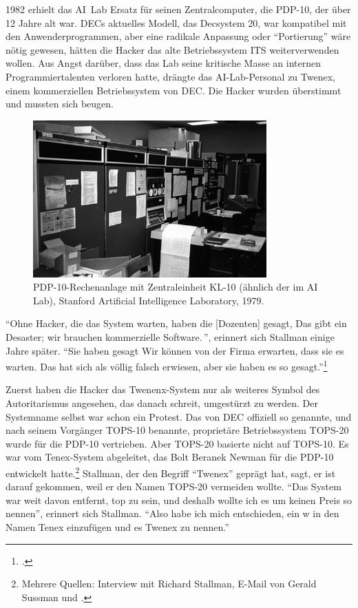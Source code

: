 1982 erhielt das AI~Lab Ersatz für seinen Zentralcomputer, die PDP-10, der über 12 Jahre alt war. DECs aktuelles Modell, das Decsystem 20, war kompatibel mit den Anwenderprogrammen, aber eine radikale Anpassung oder "`Portierung"' wäre nötig gewesen, hätten die Hacker das alte Betriebssystem ITS weiterverwenden wollen. Aus Angst darüber, dass das Lab seine kritische Masse an internen Programmiertalenten verloren hatte, drängte das AI-Lab-Personal zu Twenex, einem kommerziellen Betriebssystem von DEC. Die Hacker wurden überstimmt und mussten sich beugen.

\begin{figure}[ht] \centering
  \includegraphics[width=0.8\textwidth]{KL10_1979}
  \caption{\small PDP-10-Rechenanlage mit Zentraleinheit KL-10 (ähnlich der im AI Lab), Stanford Artificial Intelligence Laboratory, 1979.}
\end{figure}

"`Ohne Hacker, die das System warten, haben die [Dozenten] gesagt, \glq Das gibt ein Desaster; wir brauchen kommerzielle Software.\grq\,"', erinnert sich Stallman einige Jahre später. "`Sie haben gesagt \glq Wir können von der Firma erwarten, dass sie es warten.\grq{} Das hat sich als völlig falsch erwiesen, aber sie haben es so gesagt."'\footcite{rmskth}

Zuerst haben die Hacker das Twenenx-System nur als weiteres Symbol des Autoritarismus angesehen, das danach schreit, umgestürzt zu werden. Der Systemname selbst war schon ein Protest. Das von DEC offiziell so genannte, und nach seinem Vorgänger TOPS-10 benannte, proprietäre Betriebssystem TOPS-20 wurde für die PDP-10 vertrieben. Aber TOPS-20 basierte nicht auf TOPS-10. Es war vom Tenex-System abgeleitet, das Bolt Beranek Newman für die PDP-10 entwickelt hatte.\footnote{Mehrere Quellen: Interview mit Richard Stallman, E-Mail von Gerald Sussman und \cite[][Glossary: "`TWENEX"']{jargonf}.} Stallman, der den Begriff "`Twenex"' geprägt hat, sagt, er ist darauf gekommen, weil er den Namen TOPS-20 vermeiden wollte. "`Das System war weit davon entfernt, top zu sein, und deshalb wollte ich es um keinen Preis so nennen"', erinnert sich Stallman. "`Also habe ich mich entschieden, ein \glq w\grq{} in den Namen Tenex einzufügen und es Twenex zu nennen."'

